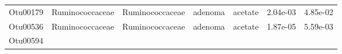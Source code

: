 \documentclass[11pt,]{article}
\begin{document}
\begin{longtable}[]{@{}ccccccc@{}}
\begin{minipage}[t]{0.09\columnwidth}\centering\strut
Otu00179\strut
\end{minipage} & \begin{minipage}[t]{0.17\columnwidth}\centering\strut
Ruminococcaceae\strut
\end{minipage} & \begin{minipage}[t]{0.17\columnwidth}\centering\strut
Ruminococcaceae\strut
\end{minipage} & \begin{minipage}[t]{0.09\columnwidth}\centering\strut
adenoma\strut
\end{minipage} & \begin{minipage}[t]{0.11\columnwidth}\centering\strut
acetate\strut
\end{minipage} & \begin{minipage}[t]{0.09\columnwidth}\centering\strut
2.04e-03\strut
\end{minipage} & \begin{minipage}[t]{0.09\columnwidth}\centering\strut
4.85e-02\strut
\end{minipage}\tabularnewline
\begin{minipage}[t]{0.09\columnwidth}\centering\strut
Otu00536\strut
\end{minipage} & \begin{minipage}[t]{0.17\columnwidth}\centering\strut
Ruminococcaceae\strut
\end{minipage} & \begin{minipage}[t]{0.17\columnwidth}\centering\strut
Ruminococcaceae\strut
\end{minipage} & \begin{minipage}[t]{0.09\columnwidth}\centering\strut
adenoma\strut
\end{minipage} & \begin{minipage}[t]{0.11\columnwidth}\centering\strut
acetate\strut
\end{minipage} & \begin{minipage}[t]{0.09\columnwidth}\centering\strut
1.87e-05\strut
\end{minipage} & \begin{minipage}[t]{0.09\columnwidth}\centering\strut
5.59e-03\strut
\end{minipage}\tabularnewline
\begin{minipage}[t]{0.09\columnwidth}\centering\strut
Otu00594\strut
\end{minipage} & \begin{minipage}[t]{0.17\columnwidth}\centering\strut

\end{minipage}
\end{longtable}
\end{document}
